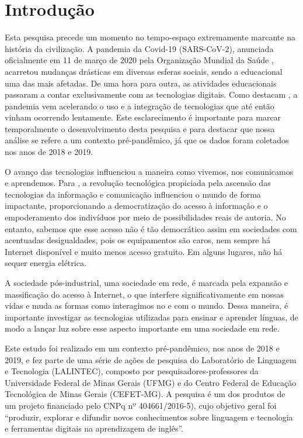 \documentclass[portuguese]{textolivre}
\begin{document}
\section{Introdução}\label{sec-intro}
Esta pesquisa precede um momento no tempo-espaço extremamente marcante na história da civilização. A pandemia da Covid-19 (SARS-CoV-2), anunciada oficialmente em 11 de março de 2020 pela Organização Mundial da Saúde \cite{who_who_2020}, acarretou mudanças drásticas em diversas esferas sociais, sendo a educacional uma das mais afetadas. De uma hora para outra, as atividades educacionais passaram a contar exclusivamente com as tecnologias digitais. Como destacam \textcite{braga_elephant_2021}, a pandemia vem acelerando o uso e a integração de tecnologias que até então vinham ocorrendo lentamente. Este esclarecimento é importante para marcar temporalmente o desenvolvimento desta pesquisa e para destacar que nossa análise se refere a um contexto pré-pandêmico, já que os dados foram coletados nos anos de 2018 e 2019.

O avanço das tecnologias influenciou a maneira como vivemos, nos comunicamos e aprendemos. Para \textcite{castells_sociedade_2006}, a revolução tecnológica propiciada pela ascensão das tecnologias da informação e comunicação influenciou o mundo de forma impactante, proporcionando a democratização do acesso à informação e o empoderamento dos indivíduos por meio de possibilidades reais de autoria. No entanto, sabemos que esse acesso não é tão democrático assim em sociedades com acentuadas desigualdades, pois os equipamentos são caros, nem sempre há Internet disponível e muito menos acesso gratuito. Em alguns lugares, não há sequer energia elétrica.

A sociedade pós-industrial, uma sociedade em rede, é marcada pela expansão e massificação do acesso à Internet, o que interfere significativamente em nossas vidas e muda as formas como interagimos no e com o mundo. Dessa maneira, é importante investigar as tecnologias utilizadas para ensinar e aprender línguas, de modo a lançar luz sobre esse aspecto importante em uma sociedade em rede.  
 
Este estudo foi realizado em um contexto pré-pandêmico, nos anos de 2018 e 2019, e fez parte de uma série de ações de pesquisa do Laboratório de Linguagem e Tecnologia (LALINTEC), composto por pesquisadores-professores da Universidade Federal de Minas Gerais (UFMG) e do Centro Federal de Educação Tecnológica de Minas Gerais (CEFET-MG). A pesquisa é um dos produtos de um projeto financiado pelo CNPq nº 404661/2016-5), cujo objetivo geral foi “produzir, explorar e difundir novos conhecimentos sobre linguagem e tecnologia e ferramentas digitais na aprendizagem de inglês”.
\end{document}
